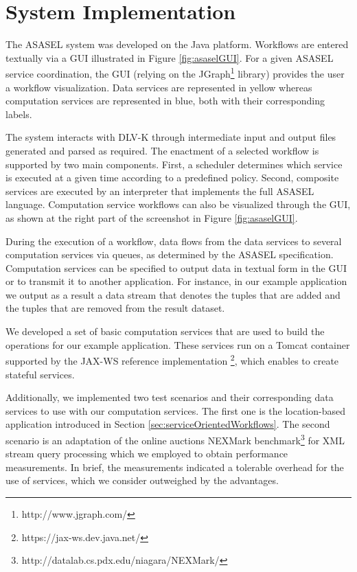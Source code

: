 
\section{System Implementation} \label{sec:asasel:demo}
	
The ASASEL system was developed on the Java platform. Workflows are entered textually via a GUI illustrated in Figure \ref{fig:asaselGUI}. For a given ASASEL service coordination, the GUI (relying on the JGraph\footnote{http://www.jgraph.com/} library) provides the user a workflow visualization. Data services are represented in yellow whereas computation services are represented in blue, both with their corresponding labels.

The system interacts with DLV-K through intermediate input and output files generated and parsed as required. The enactment of a selected workflow is supported by two main components. First, a scheduler determines which service is executed at a given time according to a predefined policy. Second, composite services are executed by an interpreter that implements the full ASASEL language. Computation service workflows can also be visualized through the GUI, as shown at the right part of the screenshot in Figure \ref{fig:asaselGUI}.
	
During the execution of a workflow, data flows from the data services to several computation services via queues, as determined by the ASASEL specification. Computation services can be specified to output data in textual form in the GUI or to transmit it to another application. For instance, in our example application we output as a result a data stream that denotes the tuples that are added and the tuples that are removed from the result dataset.
	
We developed a set of basic computation services that are used to build the operations for our example application. These services run on a Tomcat container supported by the JAX-WS reference implementation \footnote{https://jax-ws.dev.java.net/}, which enables to create stateful services.
	
Additionally, we implemented two test scenarios and their corresponding data services to use with our computation services. The first one is the location-based application introduced in Section \ref{sec:serviceOrientedWorkflows}. The second scenario is an adaptation of the online auctions NEXMark benchmark\footnote{http://datalab.cs.pdx.edu/niagara/NEXMark/} for XML stream query processing which we employed to obtain performance measurements. In brief, the measurements indicated a tolerable overhead for the use of services, which we consider outweighed by the advantages.
	
